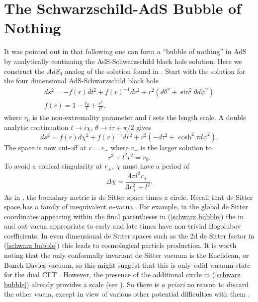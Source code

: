 \documentclass[a4paper,aps,prd,preprintnumbers,groupedaddress]{revtex4}
\begin{document}
\section{The Schwarzschild-AdS Bubble of Nothing} \label{rossbubble}
It was pointed out in \cite{birm,vijayross} that following \cite{silv02} one can form a ``bubble of nothing'' in AdS by analytically continuing the AdS-Schwarzschild black hole solution. Here we construct the $AdS_4$ analog of the solution found in \cite{birm,vijayross}.   Start with the
solution for the four dimensional AdS-Schwarzschild black hole
\begin{eqnarray}
ds^2 = -f(r)dt^2 + f(r)^{-1} dr^2 + r^2 (d\theta ^2 + \sin^2 \theta d\psi ^2 ) \nonumber \\
f(r) = 1 - \frac{r_0}{r} + \frac{r^2}{l^2} ,
\end{eqnarray}
where $r_0$ is the non-extremality parameter and $l$ sets the length scale.   A double analytic continuation $t\rightarrow i \chi$,
$\theta \rightarrow i \tau + \pi/2$  gives
\begin{equation} \label{schwarz bubble}
ds^2 = f(r) d\chi ^2 + f(r) ^{-1} dr^2 + r^2 ( - d\tau^2 + \cosh^2 \tau d \psi ^2) .
\end{equation}
The space is now cut-off at $r=r_+$ where $r_+$ is the larger solution to
\begin{equation}
r^3 + l^2 r^2 = r_0 .
\end{equation}
To avoid a conical singularity at $r_+$, $\chi$ must have a period of
\begin{equation}
\Delta \chi = \frac{4 \pi l^2 r_+}{3r_+ ^2 + l^2} .
\end{equation}
As in \cite{vijayross}, the boundary metric is de Sitter space times a circle.   Recall that de Sitter space has a family of inequivalent $\alpha$-vacua \cite{dsalpha,bms01}.
  For example, in the global de Sitter coordinates appearing within the final parentheses in (\ref{schwarz bubble}) the in and  out vacua appropriate to early and late times have non-trivial Bogolubov coefficients.   In even dimensional de Sitter spaces
such as the 2d de Sitter factor in (\ref{schwarz bubble}) this leads to cosmological particle production.   It is worth noting that the only
conformally invariant de Sitter vacuum is the Euclidean, or Bunch-Davies vacuum, so this might suggest that this is only valid vacuum state
for the dual CFT \cite{dsalpha}.   However, the presence of the additional circle in (\ref{schwarz bubble}) already provides a scale (see
\cite{vijayross}).  So there is {\it a priori} no reason to discard the other vacua, except in view of various other potential difficulties
with them \cite{dsalpha}.
\end{document}
